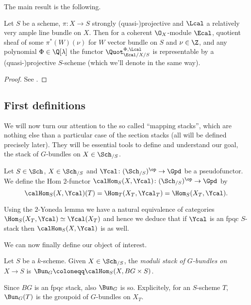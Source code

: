             The main result is the following.
            \begin{thm}
                \label{thm:quot_representable}
                Let $S$ be a scheme, $\pi\colon X \to S$ strongly (quasi-)projective and $\Lcal$ a relatively very ample line bundle on $X$. Then for a coherent $\O_X$-module $\Ecal$, quotient sheaf of some $\pi^*(W)(\nu)$ for $W$ vector bundle on $S$ and $\nu \in \Z$, and any polynomial $\Phi \in \Q[\lambda]$ the functor $\Quot_{\Ecal/X/S}^{\Phi, \Lcal}$ is representable by a (quasi-)projective $S$-scheme (which we'll denote in the same way).
            \end{thm}
            \begin{proof}
                See \cite[Theorem~2.6]{ak80}.
            \end{proof}
        \subsection{First definitions}
            We will now turn our attention to the so called ``mapping stacks'', which are nothing else than a particular case of the section stacks (all will be defined precisely later). They will be essential tools to define and understand our goal, the stack of $G$-bundles on $X \in \Sch_{/S}$.
            
            \begin{defn}
                \label{defn:hom_stack}
                Let $S \in \Sch$, $X \in \Sch_{/S}$ and $\Ycal\colon (\Sch_{/S})^{\op} \to \Gpd$ be a pseudofunctor. We define the Hom $2$-functor $\calHom_S(X, \Ycal)\colon (\Sch_{/S})^{\op} \to \Gpd$ by \[\calHom_S(X, \Ycal)(T) = \Hom_T(X_T, \Ycal_T) = \Hom_S(X_T, \Ycal). \] 
            \end{defn}
            Using the $2$-Yoneda lemma we have a natural equivalence of categories $\Hom_S(X_T, \Ycal) \simeq \Ycal(X_T)$ and hence we deduce that if $\Ycal$ is an fpqc $S$-stack then $\calHom_S(X, \Ycal)$ is as well.

            We can now finally define our object of interest.
            \begin{defn}
                \label{defn:moduli_bung}
                Let $S$ be a $k$-scheme. Given $X \in \Sch_{/S}$, the \emph{moduli stack of $G$-bundles on $X \to S$} is $\Bun_G \coloneqq \calHom_S(X, BG \times S)$.
            \end{defn}

            Since $BG$ is an fpqc stack, also $\Bun_G$ is so. Explicitely, for an $S$-scheme $T$, $\Bun_G(T)$ is the groupoid of $G$-bundles on $X_T$.

